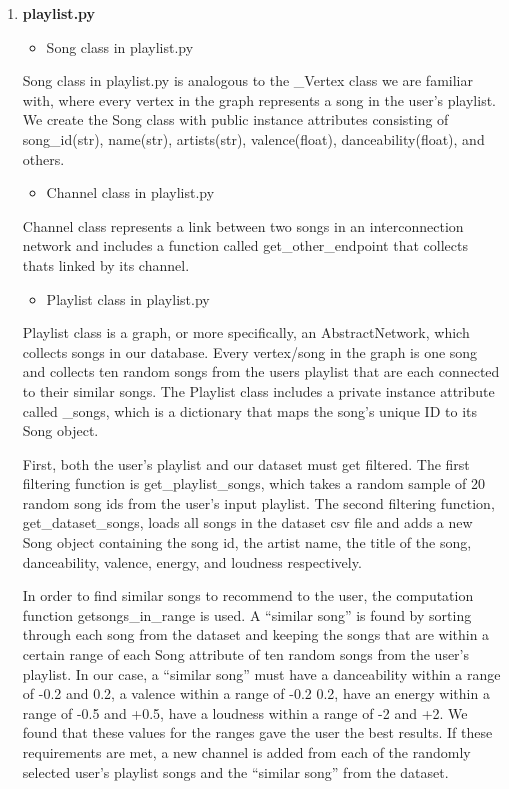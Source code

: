 \documentclass[fontsize=11pt]{article}
\begin{document}
\begin{enumerate}
\begin{enumerate}
        \item\textbf{playlist.py}
        \begin{itemize}\item Song class in playlist.py
        \end{itemize}
        Song class in playlist.py is analogous to the \_Vertex class we are familiar with, where every vertex in the graph represents a song in the user’s playlist. We create the Song class with public instance attributes consisting of song\_id(str), name(str), artists(str), valence(float), danceability(float), and others.

        \begin{itemize}\item Channel class in playlist.py
        \end{itemize}
        Channel class represents a link between two songs in an interconnection network and includes a function called get\_other\_endpoint that collects thats linked by its channel.

        \begin{itemize}\item Playlist class in playlist.py
        \end{itemize}
        Playlist class is a graph, or more specifically, an AbstractNetwork, which collects songs in our database. Every vertex/song in the graph is one song and collects ten random songs from the users playlist that are each connected to their similar songs. The Playlist class includes a private instance attribute called \_songs, which is a dictionary that maps the song’s unique ID to its Song object. 
        \newline

        First, both the user’s playlist and our dataset must get filtered. The first filtering function is  get\_playlist\_songs, which takes a random sample of 20 random song ids from the user’s input playlist. The second filtering function, get\_dataset\_songs, loads all songs in the dataset csv file and adds a new Song object containing the song id, the artist name, the title of the song, danceability, valence, energy, and loudness respectively.
        \newline

        In order to find similar songs to recommend to the user, the computation function getsongs\_in\_range is used. A “similar song” is found by sorting through each song from the dataset and keeping the songs that are within a certain range of each Song attribute of ten random songs from the user’s playlist. In our case, a “similar song” must have a danceability within a range of -0.2 and 0.2, a valence within a range of -0.2  0.2, have an energy within a range of -0.5 and +0.5, have a loudness within a range of -2 and +2. We found that these values for the ranges gave the user the best results. If these requirements are met, a new channel is added from each of the randomly selected user’s playlist songs and the “similar song” from the dataset.
    


\end{enumerate}
\end{enumerate}
\end{document}
